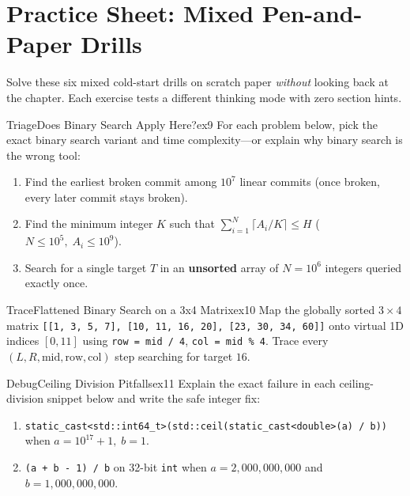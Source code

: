 \documentclass[11pt,a4paper]{article}
\theoremstyle{definition}
\newcounter{exercise}
\begin{document}
\section*{Practice Sheet: Mixed Pen-and-Paper Drills}

\noindent
Solve these six mixed cold-start drills on scratch paper \emph{without} looking back at the chapter. Each exercise tests a different thinking mode with zero section hints.

\begin{tryitbox}{Triage}{Does Binary Search Apply Here?}{ex9}
For each problem below, pick the exact binary search variant and time complexity---or explain why binary search is the wrong tool:
\begin{enumerate}
    \item Find the earliest broken commit among $10^7$ linear commits (once broken, every later commit stays broken).
    \item Find the minimum integer $K$ such that $\sum_{i=1}^N \lceil A_i / K \rceil \le H$ ($N \le 10^5,\; A_i \le 10^9$).
    \item Search for a single target $T$ in an \textbf{unsorted} array of $N = 10^6$ integers queried exactly once.
\end{enumerate}
\end{tryitbox}

\begin{tryitbox}{Trace}{Flattened Binary Search on a 3x4 Matrix}{ex10}
Map the globally sorted $3 \times 4$ matrix \texttt{[[1, 3, 5, 7], [10, 11, 16, 20], [23, 30, 34, 60]]} onto virtual 1D indices $[0, 11]$ using \texttt{row = mid / 4}, \texttt{col = mid \% 4}. Trace every $(L, R, \text{mid}, \text{row}, \text{col})$ step searching for target $16$.
\end{tryitbox}

\begin{tryitbox}{Debug}{Ceiling Division Pitfalls}{ex11}
Explain the exact failure in each ceiling-division snippet below and write the safe integer fix:
\begin{enumerate}
    \item \texttt{static\_cast<std::int64\_t>(std::ceil(static\_cast<double>(a) / b))} when $a = 10^{17} + 1,\; b = 1$.
    \item \texttt{(a + b - 1) / b} on 32-bit \texttt{int} when $a = 2{,}000{,}000{,}000$ and $b = 1{,}000{,}000{,}000$.
\end{enumerate}
\end{tryitbox}
\end{document}
